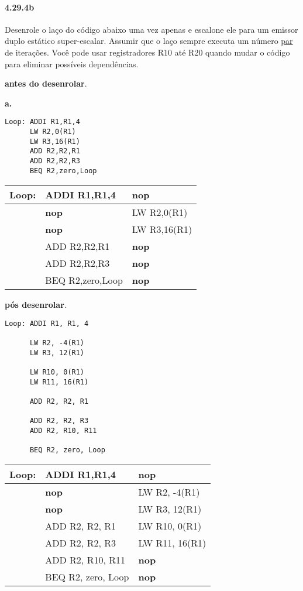 \documentclass{article}
\begin{document}
\paragraph{4.29.4b} Desenrole o laço do código abaixo uma vez apenas e escalone
ele para um emissor duplo estático super-escalar. Assumir que o laço sempre
executa um número \underline{par} de iterações. Você pode usar registradores R10
até R20 quando mudar o código para eliminar possíveis dependências.

\textbf{antes do desenrolar}.

\textbf{a.}

\begin{verbatim}
Loop: ADDI R1,R1,4
      LW R2,0(R1)
      LW R3,16(R1)
      ADD R2,R2,R1
      ADD R2,R2,R3
      BEQ R2,zero,Loop
\end{verbatim}

\begin{tabular}{|c|l|l|}
\hline Loop: & ADDI R1,R1,4 & \textbf{nop} \\ 
\hline & \textbf{nop} & LW R2,0(R1) \\
\hline & \textbf{nop} & LW R3,16(R1) \\
\hline & ADD R2,R2,R1 & \textbf{nop} \\ 
\hline & ADD R2,R2,R3 & \textbf{nop} \\
\hline & BEQ R2,zero,Loop & \textbf{nop} \\
\hline
\end{tabular} 

\textbf{pós desenrolar}.

\begin{verbatim}
Loop: ADDI R1, R1, 4

      LW R2, -4(R1)
      LW R3, 12(R1)

      LW R10, 0(R1)
      LW R11, 16(R1)

      ADD R2, R2, R1

      ADD R2, R2, R3
      ADD R2, R10, R11

      BEQ R2, zero, Loop
\end{verbatim}

\begin{tabular}{|c|l|l|}
\hline Loop: & ADDI R1,R1,4 & \textbf{nop} \\
\hline & \textbf{nop} & LW R2, -4(R1) \\
\hline & \textbf{nop} & LW R3, 12(R1) \\
\hline & ADD R2, R2, R1 & LW R10, 0(R1) \\
\hline & ADD R2, R2, R3 & LW R11, 16(R1) \\
\hline & ADD R2, R10, R11 & \textbf{nop} \\
\hline & BEQ R2, zero, Loop & \textbf{nop} \\
\hline
\end{tabular} 
\end{document}
